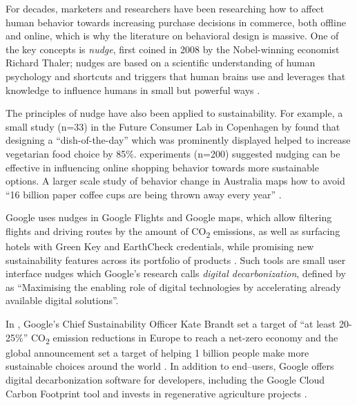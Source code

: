 \documentclass[
  letterpaper,
  DIV=11,
  numbers=noendperiod]{scrartcl}
\begin{document}
For decades, marketers and researchers have been researching how to
affect human behavior towards increasing purchase decisions in commerce,
both offline and online, which is why the literature on behavioral
design is massive. One of the key concepts is \emph{nudge}, first coined
in 2008 by the Nobel-winning economist Richard Thaler; nudges are based
on a scientific understanding of human psychology and shortcuts and
triggers that human brains use and leverages that knowledge to influence
humans in small but powerful ways
\citep{thalerNudgeImprovingDecisions2009}.

The principles of nudge have also been applied to sustainability. For
example, a small study (n=33) in the Future Consumer Lab in Copenhagen
by \citet{perez-cuetoNudgingPlantbasedMeals2021} found that designing a
``dish-of-the-day'' which was prominently displayed helped to increase
vegetarian food choice by 85\%. \citet{GUATH2022101821} experiments
(n=200) suggested nudging can be effective in influencing online
shopping behavior towards more sustainable options. A larger scale study
of behavior change in Australia maps how to avoid ``16 billion paper
coffee cups are being thrown away every year''
\citep{novoradovskayaMyCupTea2021}.

Google uses nudges in Google Flights and Google maps, which allow
filtering flights and driving routes by the amount of
CO\textsubscript{2} emissions, as well as surfacing hotels with Green
Key and EarthCheck credentials, while promising new sustainability
features across its portfolio of products
\citet{sundarpichaiGivingYouMore2021}. Such tools are small user
interface nudges which Google's research calls \emph{digital
decarbonization}, defined by
\citet{implementconsultinggroupHowDigitalSector2022} as ``Maximising the
enabling role of digital technologies by accelerating already available
digital solutions''.

In \citet{katebrandtGoogleClimateAction2022}, Google's Chief
Sustainability Officer Kate Brandt set a target of ``at least 20-25\%''
CO\textsubscript{2} emission reductions in Europe to reach a net-zero
economy and the global announcement set a target of helping 1 billion
people make more sustainable choices around the world
\citep{jenimilesBecomingSustainabilityAwareApp2022}. In addition to
end--users, Google offers digital decarbonization software for
developers, including the Google Cloud Carbon Footprint tool and invests
in regenerative agriculture projects
\citep{GoogleRegenerativeAgriculture2021, googleCarbonFootprint2023}.
\end{document}
